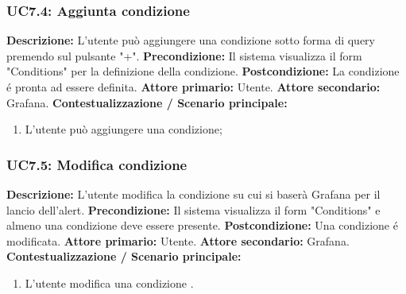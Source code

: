                 
                \subsubsection{UC7.4: Aggiunta condizione }
                    \textbf{Descrizione:} L’utente può aggiungere una condizione sotto forma di query premendo sul pulsante "+".
                    \newline
                    \textbf{Precondizione:} Il sistema visualizza il form "Conditions" per la definizione della condizione.
                    \newline
                    \textbf{Postcondizione:} La condizione é pronta ad essere definita.
                    \newline
                    \textbf{Attore primario:} Utente.
                    \newline
                    \textbf{Attore secondario:} Grafana.
                    \newline
                    \textbf{Contestualizzazione / Scenario principale:} \begin{enumerate}
                            \item L'utente può aggiungere una condizione;
                        \end{enumerate}   
                      
                \subsubsection{UC7.5: Modifica condizione }
                    \textbf{Descrizione:} L’utente modifica la condizione su cui si baserà Grafana per il lancio dell'alert.
                    \newline
                    \textbf{Precondizione:} Il sistema visualizza il form "Conditions" e almeno una condizione deve essere presente.
                    \newline
                    \textbf{Postcondizione:} Una condizione é modificata.
                    \newline
                    \textbf{Attore primario:} Utente.
                    \newline
                    \textbf{Attore secondario:} Grafana.
                    \newline
                    \textbf{Contestualizzazione / Scenario principale:} \begin{enumerate}
                            \item L'utente modifica una condizione .
                        \end{enumerate}  
                

